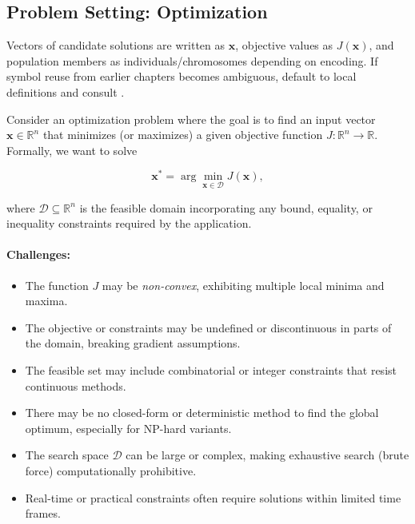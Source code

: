\subsection{Problem Setting: Optimization}
\label{sec:evo_problem_setting_optimization}

\begin{tcolorbox}[summarybox, title={Notation handoff}]
Vectors of candidate solutions are written as \(\mathbf{x}\), objective values as \(J(\mathbf{x})\), and population members as individuals/chromosomes depending on encoding. If symbol reuse from earlier chapters becomes ambiguous, default to local definitions and consult .
\end{tcolorbox}

Consider an optimization problem where the goal is to find an input vector \( \mathbf{x} \in \mathbb{R}^n \) that minimizes (or maximizes) a given objective function \( J: \mathbb{R}^n \to \mathbb{R} \). Formally, we want to solve

\begin{equation}
    \mathbf{x}^* = \arg \min_{\mathbf{x} \in \mathcal{D}} J(\mathbf{x}), \label{eq:optimization_problem}
\end{equation}

where \(\mathcal{D} \subseteq \mathbb{R}^n\) is the feasible domain incorporating any bound, equality, or inequality constraints required by the application.

\paragraph{Challenges:}

\begin{itemize}
    \item The function \( J \) may be \emph{non-convex}, exhibiting multiple local minima and maxima.
    \item The objective or constraints may be undefined or discontinuous in parts of the domain, breaking gradient assumptions.
    \item The feasible set may include combinatorial or integer constraints that resist continuous methods.
    \item There may be no closed-form or deterministic method to find the global optimum, especially for NP-hard variants.
    \item The search space \(\mathcal{D}\) can be large or complex, making exhaustive search (brute force) computationally prohibitive.
    \item Real-time or practical constraints often require solutions within limited time frames.
\end{itemize}

